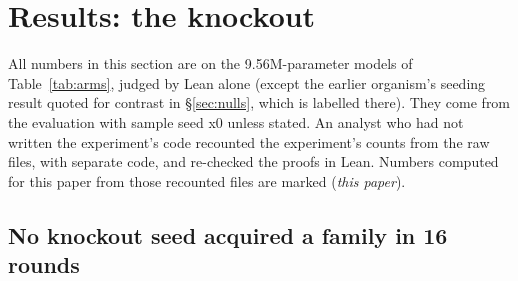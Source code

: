 \section{Results: the \sig{} knockout}
\label{sec:results}

All numbers in this section are on the 9.56M-parameter models of Table~\ref{tab:arms}, judged by Lean alone \rv{} (except
the earlier organism's seeding result quoted for contrast in \S\ref{sec:nulls}, which is labelled there). They come
from the evaluation with sample seed x0 unless stated. An analyst who had not written the experiment's code recounted the
experiment's counts from the raw files, with separate code, and re-checked the proofs in Lean. Numbers computed for this
paper from those recounted files are marked (\emph{this paper}).

\subsection{No knockout seed acquired a family in 16 rounds}
\label{sec:primary}

